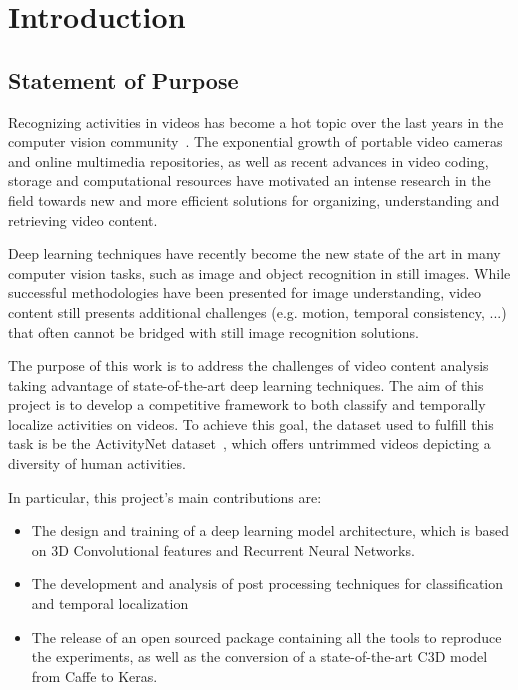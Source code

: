 \chapter{Introduction}

\section{Statement of Purpose}

Recognizing activities in videos has become a hot topic over the last years in the computer vision community~\cite{ngiam2011multimodal}. The exponential growth of portable video cameras and online multimedia repositories, as well as recent advances in video coding, storage and computational resources have motivated an intense research in the field towards new and more efficient solutions for organizing, understanding and retrieving video content.

Deep learning techniques have recently become the new state of the art in many computer vision tasks, such as image and object recognition in still images. While successful methodologies have been presented for image understanding, video content still presents additional challenges (e.g. motion, temporal consistency, ...)  that often cannot be bridged with still image recognition solutions.

The purpose of this work is to address the challenges of video content analysis taking advantage of state-of-the-art deep learning techniques. The aim of this project is to develop a competitive framework to both classify and temporally localize activities on videos. To achieve this goal, the dataset used to fulfill this task is be the ActivityNet dataset~\cite{caba2015activitynet}, which offers untrimmed videos depicting a diversity of human activities.

In particular, this project's main contributions are:
\begin{itemize}
	\item The design and training of a deep learning model architecture, which is based on 3D Convolutional features and Recurrent Neural Networks.
    \item The development and analysis of post processing techniques for classification and temporal localization
    \item The release of an open sourced package containing all the tools to reproduce the experiments, as well as the conversion of a state-of-the-art C3D model from Caffe to Keras.
\end{itemize}

